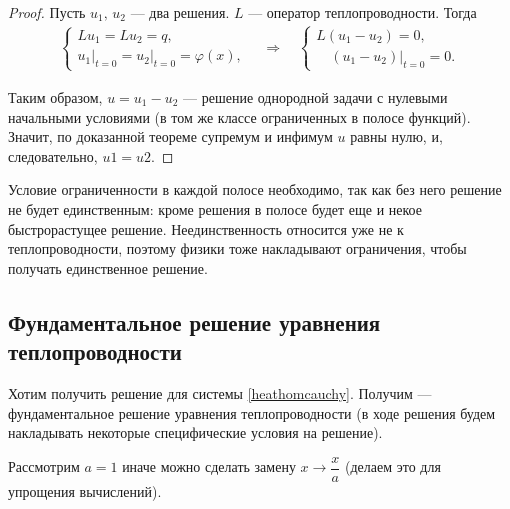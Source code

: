 \begin{proof}
Пусть $u_1, \, u_2 $ --- два решения. $L$ --- оператор теплопроводности.  Тогда
\begin{align*}
	\begin{cases*}
		Lu_1 = Lu_2 = q, \\
		u_1\Big\rvert_{t=0} = u_2\Big\rvert_{t=0} = \varphi(x),
	\end{cases*}
	\quad \Rightarrow \quad
	\begin{cases*}
		L(u_1 - u_2) = 0, \\
		\quad (u_1-u_2) \Big\rvert_{t=0}=0.
	\end{cases*}
\end{align*}

Таким образом, $u = u_1 - u_2$ --- решение однородной задачи с нулевыми начальными условиями (в том же классе ограниченных в полосе функций). Значит, по доказанной теореме супремум и инфимум $u$ равны нулю, и, следовательно, $u1 = u2$.

\end{proof}

\begin{note}
Условие ограниченности в каждой полосе необходимо, так как без него решение не будет единственным: кроме решения в полосе будет еще и некое быстрорастущее решение. Неединственность относится уже не к теплопроводности, поэтому физики тоже накладывают ограничения, чтобы получать единственное решение.
\end{note}


\subsection{Фундаментальное решение уравнения теплопроводности}

Хотим получить решение для системы \eqref{heathomcauchy}. Получим --- фундаментальное решение уравнения теплопроводности (в ходе решения будем накладывать некоторые специфические условия на решение).

Рассмотрим $a = 1$ иначе можно сделать замену $x \rightarrow \dfrac{x}{a}$ (делаем это для упрощения вычислений).


